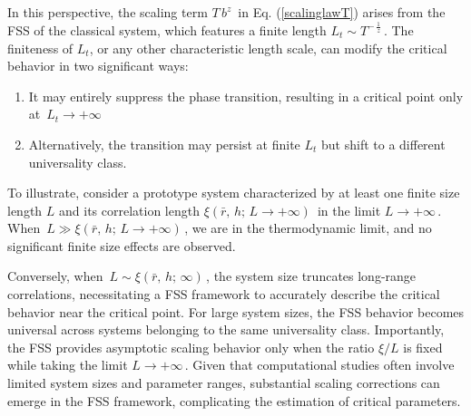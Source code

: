 In this perspective, the scaling term $T\,b^z\,$ in Eq. (\ref{scalinglawT}) arises from the FSS of the classical system, which features a finite length $L_t \sim T^{-\,\frac{1}{z}}\,$. The finiteness of $L_t$, or any other characteristic length scale, can modify the critical behavior in two significant ways:

\begin{enumerate}
	\item It may entirely suppress the phase transition, resulting in a critical point only at $\,L_t \to +\infty\,$

	\item Alternatively, the transition may persist at finite $L_t$ but shift to a different universality class.
\end{enumerate}

  
To illustrate, consider a prototype system characterized by at least one finite size length $L$ and its correlation length $\xi(\bar r, \, h ;\,L \to +\infty)\,$  in the limit $L \to +\infty\,$. When $\,L\gg  \xi(\bar r, \, h ;\,L \to +\infty)\,$, we are in the thermodynamic limit, and no significant finite size effects are observed.

Conversely, when $\, L \sim \xi(\bar r, \, h ;\,\infty)\,$, the system size truncates long-range correlations, necessitating a FSS framework to accurately describe the critical behavior near the critical point. For large system sizes, the FSS behavior becomes universal across systems belonging to the same universality class. Importantly, the FSS provides asymptotic scaling behavior only when the ratio $\xi/L$ is fixed while taking the limit $L \to +\infty\,$. Given that computational studies often involve limited system sizes and parameter ranges, substantial scaling corrections can emerge in the FSS framework, complicating the estimation of critical parameters.

